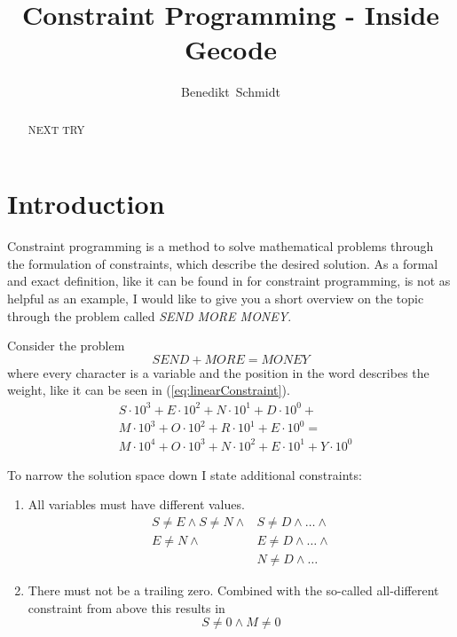 \documentclass[10pt,
               a4paper,
               journal,
               ]{IEEEtran}
\makeatletter
\def\markboth#1#2{\def\leftmark{\@IEEEcompsoconly{\sffamily}\MakeUppercase{\protect#1}}%
\def\rightmark{\@IEEEcompsoconly{\sffamily}\MakeUppercase{\protect#2}}}
\newcommand{\refeq}[1]{{(\ref{#1})}}
\makeatother
\begin{document}
	\title{Constraint Programming - Inside Gecode}
	\author{Benedikt~Schmidt}
	\markboth{Advanced Seminar for Security in Information Technology, Summer Term 2014}%
	{Benedikt Schmidt: Constraint Programming - Inside Gecode}	
	\maketitle	
	
	\begin{abstract}	
		NEXT TRY
	\end{abstract}
	
	\section{Introduction}
	Constraint programming is a method to solve mathematical problems through the formulation of constraints, which describe the desired solution. As a formal and exact definition, like it can be found in \cite[p.~16]{handbookCP} for constraint programming, is not as helpful as an example, I would like to give you a short overview on the topic through the problem called \emph{SEND MORE MONEY}.
	
	Consider the problem
	\[SEND + MORE = MONEY\]
	where every character is a variable and the position in the word describes the weight, like it can be seen in \refeq{eq:linearConstraint}.
	\begin{equation}
	\label{eq:linearConstraint}
	\begin{split}
		& S \cdot 10^3 + E \cdot 10^2 + N \cdot 10^1 + D \cdot 10^0 + \\ 
		& M \cdot 10^3 + O \cdot 10^2 + R \cdot 10^1 + E \cdot 10^0 = \\ 
		& M \cdot 10^4 + O \cdot 10^3 + N \cdot 10^2 + E \cdot 10^1 + Y \cdot 10^0
	\end{split}
	\end{equation}		
	
	To narrow the solution space down I state additional constraints:
	\begin{enumerate}
	\item All variables must have different values.
		\begin{equation}
		\label{eq:allDifferent}
		\begin{split}
			S \ne E \land S \ne N \land & S \ne D \land \dots \land \\
			E \ne N \land & E \ne D \land \dots \land \\
			& N \ne D \land \dots
		\end{split}
		\end{equation}	
	\item There must not be a trailing zero. Combined with the so-called all-different constraint \cite{allDifferent} from above this results in
		\begin{equation}
			\label{eq:trailingZero}
			S \ne 0 \land M \ne 0
		\end{equation}
	\end{enumerate}
	
\end{document}
